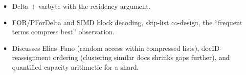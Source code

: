\begin{interviewq}

\goodgreat
\begin{itemize}
    \item {} Delta + varbyte with the residency argument.
    \item {} FOR/PForDelta and SIMD block decoding, skip-list co-design, the ``frequent terms compress best'' observation.
    \item {} Discusses Elias--Fano (random access within compressed lists), docID-reassignment ordering (clustering similar docs shrinks gaps further), and quantified capacity arithmetic for a shard.
\end{itemize}

\end{interviewq}

